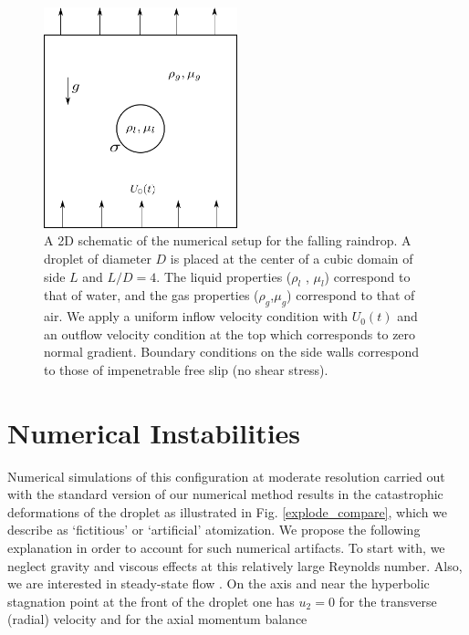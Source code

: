 \begin{figure}[h!]
\begin{center}
\includegraphics[width=0.5\textwidth]{plots/raindrop/setup.png}
\end{center}
\caption{A 2D schematic of the numerical setup for the falling raindrop. 
	A droplet of diameter $D$ is placed at the center of a cubic domain 
	of side $L$ and $L/D = 4$. The liquid properties ($\rho_l$ , $\mu_l$) 
	correspond to that of water, and the gas properties ($\rho_g$,$\mu_g$) 
	correspond to that of air. We apply a uniform inflow velocity condition 
	with $U_0(t)$ and an outflow velocity condition at the top which 
	corresponds to zero normal gradient.
	Boundary conditions on the side walls correspond 
	to those of impenetrable free slip (no shear stress).}
\label{setup}
\end{figure}

\section{Numerical Instabilities}

Numerical simulations of this configuration at moderate resolution 
carried out with the standard version
of our numerical method results in the catastrophic 
deformations of the droplet as illustrated in Fig. \ref{explode_compare}, 
which we describe as `fictitious' or `artificial' atomization. 
We propose the following explanation in order to account for such numerical artifacts. 
To start with, we neglect gravity and viscous effects at this relatively large Reynolds number. 
Also, we are interested in steady-state flow 
. 
On the axis and near the hyperbolic stagnation point 
at the front of the droplet one has $u_2=0$ for the transverse 
(radial) velocity and for the axial momentum balance


